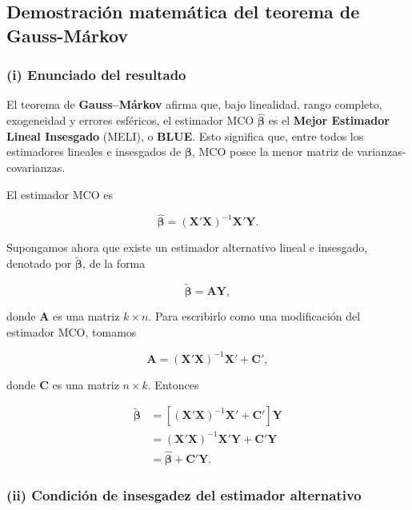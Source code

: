 \documentclass[11pt,a4paper]{article}
\begin{document}
\subsection*{Demostración matemática del teorema de Gauss-Márkov}

\subsubsection*{(i) Enunciado del resultado}

\begin{concepto}
El teorema de \textbf{Gauss--Márkov} afirma que, bajo linealidad, rango completo, exogeneidad y errores esféricos, el estimador MCO \(\hat{\boldsymbol{\beta}}\) es el \textbf{Mejor Estimador Lineal Insesgado} (MELI), o \textbf{BLUE}. Esto significa que, entre todos los estimadores lineales e insesgados de \(\boldsymbol{\beta}\), MCO posee la menor matriz de varianzas-covarianzas.
\end{concepto}

El estimador MCO es

\[
\hat{\boldsymbol{\beta}}=(\mathbf{X}'\mathbf{X})^{-1}\mathbf{X}'\mathbf{Y}.
\]

Supongamos ahora que existe un estimador alternativo lineal e insesgado, denotado por \(\tilde{\boldsymbol{\beta}}\), de la forma

\[
\tilde{\boldsymbol{\beta}}=\mathbf{A}\mathbf{Y},
\]

donde \(\mathbf{A}\) es una matriz \(k\times n\). Para escribirlo como una modificación del estimador MCO, tomamos

\[
\mathbf{A}=(\mathbf{X}'\mathbf{X})^{-1}\mathbf{X}'+\mathbf{C}',
\]

donde \(\mathbf{C}\) es una matriz \(n\times k\). Entonces

\begin{align*}
\tilde{\boldsymbol{\beta}}
&=\left[(\mathbf{X}'\mathbf{X})^{-1}\mathbf{X}'+\mathbf{C}'\right]\mathbf{Y} \\
&=(\mathbf{X}'\mathbf{X})^{-1}\mathbf{X}'\mathbf{Y}+\mathbf{C}'\mathbf{Y} \\
&=\hat{\boldsymbol{\beta}}+\mathbf{C}'\mathbf{Y}.
\end{align*}

\subsubsection*{(ii) Condición de insesgadez del estimador alternativo}
\end{document}

